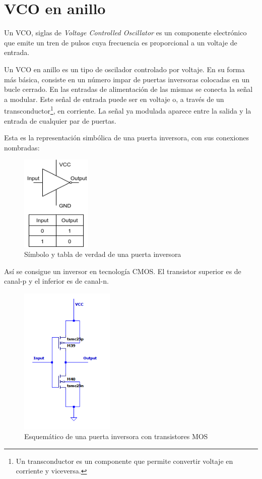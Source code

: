\documentclass[12pt]{report} %
\begin{document}
	\section{VCO en anillo}
	
	Un VCO, siglas de \textit{Voltage Controlled Oscillator} es un componente electrónico que emite un tren de pulsos cuya frecuencia es proporcional a un voltaje de entrada.
	
	Un VCO en anillo es un tipo de oscilador controlado por voltaje. En su forma más básica, consiste en un número impar de puertas inversoras colocadas en un bucle cerrado. En las entradas de alimentación de las mismas se conecta la señal a modular. Este señal de entrada puede ser en voltaje o, a través de un transconductor\footnote{Un transconductor es un componente que permite convertir voltaje en corriente y viceversa.}, en corriente. La señal ya modulada aparece entre la salida y la entrada de cualquier par de puertas.
	
	Esta es la representación simbólica de una puerta inversora, con sus conexiones nombradas:
	\begin{figure}[H]
		\includegraphics[width=0.3\textwidth]{inverter-symbol.png}
		\caption[Símbolo y tabla de verdad de una puerta inversora]{Símbolo y tabla de verdad de una puerta inversora}
		\label{fig:inverter-symbol.png}
	\end{figure}
	
	Así se consigue un inversor en tecnología CMOS. El transistor superior es de canal-p y el inferior es de canal-n.
	\begin{figure}[H]
		\includegraphics[width=0.4\textwidth]{inverter-sch.png}
		\caption[Esquemático de una puerta inversora con transistores MOS]{Esquemático de una puerta inversora con transistores MOS}
		\label{fig:inverter-sch.png}
	\end{figure}
	
\end{document}
